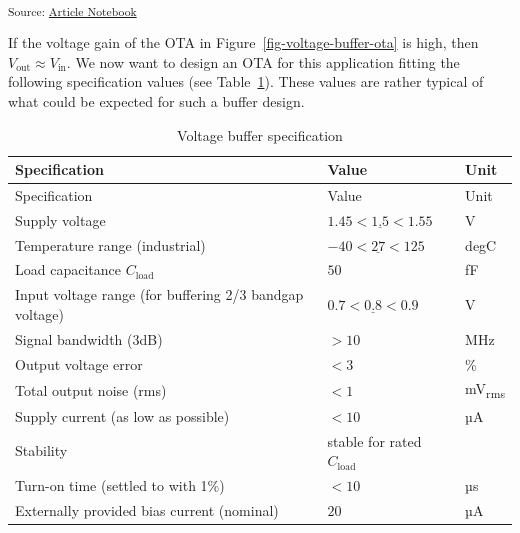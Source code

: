 \documentclass[
  a4paper,
  DIV=11,
  numbers=noendperiod]{scrartcl}
\begin{document}
\textsubscript{Source:
\href{https://iic-jku.github.io/analog-circuit-design/index.qmd.html}{Article
Notebook}}

If the voltage gain of the OTA in Figure~\ref{fig-voltage-buffer-ota} is
high, then \(V_\mathrm{out} \approx V_\mathrm{in}\). We now want to
design an OTA for this application fitting the following specification
values (see Table~\ref{tbl-voltage-buffer-spec}). These values are
rather typical of what could be expected for such a buffer design.

\begin{longtable}[]{@{}
  >{\raggedright\arraybackslash}p{}
  >{\centering\arraybackslash}p{}
  >{\centering\arraybackslash}p{}@{}}
\caption{Voltage buffer
specification}\label{tbl-voltage-buffer-spec}\tabularnewline
\toprule\noalign{}
\begin{minipage}[b]{\linewidth}\raggedright
Specification
\end{minipage} & \begin{minipage}[b]{\linewidth}\centering
Value
\end{minipage} & \begin{minipage}[b]{\linewidth}\centering
Unit
\end{minipage} \\
\midrule\noalign{}
\endfirsthead
\toprule\noalign{}
\begin{minipage}[b]{\linewidth}\raggedright
Specification
\end{minipage} & \begin{minipage}[b]{\linewidth}\centering
Value
\end{minipage} & \begin{minipage}[b]{\linewidth}\centering
Unit
\end{minipage} \\
\midrule\noalign{}
\endhead
\bottomrule\noalign{}
\endlastfoot
Supply voltage & \(1.45 < \underline{1.5} < 1.55\) & V \\
Temperature range (industrial) & \(-40 < \underline{27} < 125\) &
degC \\
Load capacitance \(C_\mathrm{load}\) & \(50\) & fF \\
Input voltage range (for buffering 2/3 bandgap voltage) &
\(0.7 < \underline{0.8} < 0.9\) & V \\
Signal bandwidth (3dB) & \(>10\) & MHz \\
Output voltage error & \(<3\) & \% \\
Total output noise (rms) & \(<1\) & mV\textsubscript{rms} \\
Supply current (as low as possible) & \(<10\) & µA \\
Stability & stable for rated \(C_\mathrm{load}\) & \\
Turn-on time (settled to with 1\%) & \(<10\) & µs \\
Externally provided bias current (nominal) & \(20\) & µA \\
\end{longtable}
\end{document}
